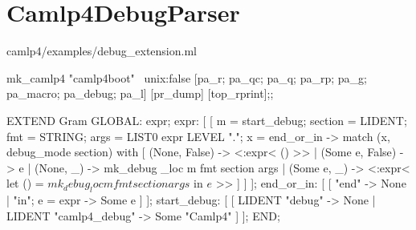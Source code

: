 \section{Camlp4DebugParser}


camlp4/examples/debug_extension.ml


mk_camlp4 "camlp4boot" ~unix:false
  [pa_r; pa_qc; pa_q; pa_rp; pa_g; pa_macro; pa_debug; pa_l] [pr_dump] [top_rprint];;




\begin{ocamlcode}
  EXTEND Gram
    GLOBAL: expr;
    expr:
    [ [ m = start_debug; section = LIDENT; fmt = STRING;
        args = LIST0 expr LEVEL "."; x = end_or_in ->
      match (x, debug_mode section) with
      [ (None,   False) -> <:expr< () >>
      | (Some e, False) -> e
      | (None, _) -> mk_debug _loc m fmt section args
      | (Some e, _) -> <:expr< let () = $mk_debug _loc m fmt section args$ in $e$ >> ]
    ] ];
    end_or_in:
    [ [ "end" -> None
      | "in"; e = expr -> Some e
    ] ];
    start_debug:
    [ [ LIDENT "debug" -> None
      | LIDENT "camlp4_debug" -> Some "Camlp4"
    ] ];
  END;
\end{ocamlcode}

